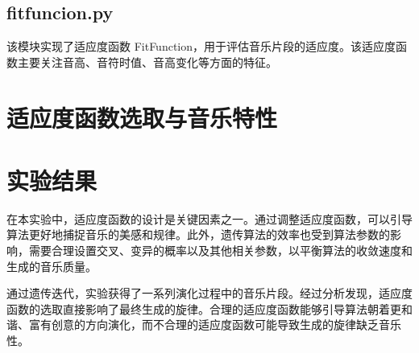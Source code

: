 \documentclass{article}
\begin{document}
\subsection{fitfuncion.py}
该模块实现了适应度函数 FitFunction，用于评估音乐片段的适应度。该适应度函数主要关注音高、音符时值、音高变化等方面的特征。



\section{适应度函数选取与音乐特性}



\section{实验结果}
在本实验中，适应度函数的设计是关键因素之一。通过调整适应度函数，可以引导算法更好地捕捉音乐的美感和规律。此外，遗传算法的效率也受到算法参数的影响，需要合理设置交叉、变异的概率以及其他相关参数，以平衡算法的收敛速度和生成的音乐质量。


通过遗传迭代，实验获得了一系列演化过程中的音乐片段。经过分析发现，适应度函数的选取直接影响了最终生成的旋律。合理的适应度函数能够引导算法朝着更和谐、富有创意的方向演化，而不合理的适应度函数可能导致生成的旋律缺乏音乐性。
\end{document}
